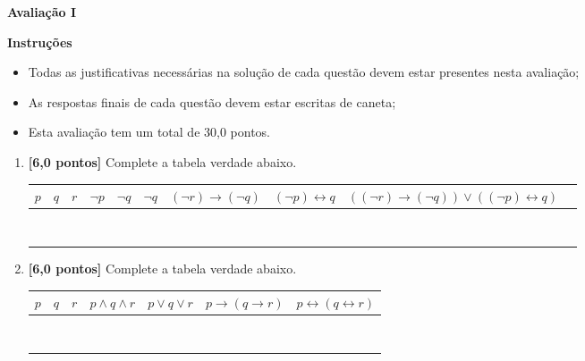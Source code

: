 \documentclass[12pt,a4paper]{article}
\begin{document}
\begin{center}
 \textbf{Avaliação I}
\end{center}

\textbf{Instruções}
\begin{itemize}
 \item Todas as justificativas necessárias na solução de cada questão devem 
 estar presentes nesta avaliação;
 \item As respostas finais de cada questão devem estar escritas de caneta;
 \item Esta avaliação tem um total de 30,0 pontos.
\end{itemize}

\begin{enumerate}
  \item \textbf{[6,0 pontos]} Complete a tabela verdade abaixo.
  
  \begin{center}
    \begin{tabular}{|c|c|c|c|c|c|c|c|c|c|}
      \hline
      $p$ & $q$ & $r$ & $\lnot p$ & $\lnot q$ & 
      $\lnot q$ & $(\lnot r) \rightarrow (\lnot q)$ & 
      $(\lnot p)\leftrightarrow q$ & 
      $((\lnot r) \rightarrow (\lnot q))\vee ((\lnot p)\leftrightarrow q)$\\ \hline
       & & & & & & & & \\ \hline
       & & & & & & & &  \\ \hline
       & & & & & & & &  \\ \hline
       & & & & & & & &  \\ \hline
       & & & & & & & &  \\ \hline
       & & & & & & & &  \\ \hline
       & & & & & & & &  \\ \hline
       & & & & & & & &  \\ \hline
    \end{tabular}
  \end{center}

  \item \textbf{[6,0 pontos]} Complete a tabela verdade abaixo.
  
  \begin{center}
    \begin{tabular}{|c|c|c|c|c|c|c|}
      \hline
      $p$ & $q$ & $r$ &
      $p\wedge q \wedge r$ &
      $p\vee q \vee r$ &
      $p\to (q\to r)$ &
      $p\leftrightarrow (q\leftrightarrow r)$\\ \hline
       & & & & & & \\ \hline
       & & & & & & \\ \hline
       & & & & & & \\ \hline
       & & & & & & \\ \hline
       & & & & & & \\ \hline
       & & & & & & \\ \hline
       & & & & & & \\ \hline
       & & & & & & \\ \hline
    \end{tabular}
  \end{center}
    

\end{enumerate}
\end{document}
